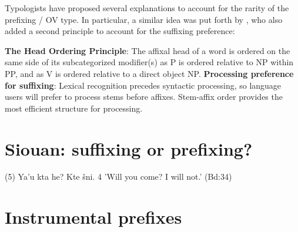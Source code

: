 \documentclass[oldfontcommands,twoside,a4paper,12pt]{article}
\begin{document}
Typologists have proposed several explanations to account for the rarity of the prefixing / OV type. In particular, a similar idea was put forth by \citet[227]{hawkins88prefixing}, who also added a second principle to account for the suffixing preference:
\begin{exe}
\ex \label{ex:hawkins}
\begin{xlist}[(ii)]
\glt \textbf{The Head Ordering Principle}: The affixal head of a word is ordered on the same side of its
subcategorized modifier(s) as P is ordered relative to NP within PP, and as V is ordered relative to a direct object NP.
\glt \textbf{Processing preference for suffixing}:
Lexical recognition precedes syntactic processing, so language users will prefer to process stems before affixes. Stem-affix order provides the most efficient structure for processing.
   \end{xlist}
\end{exe}

\citet{mithun03prefixes}

\citet{rice2000scope}

\citet{jacques13harmonization}

\section{Siouan: suffixing or prefixing?}
\citet{taylor96lakhota}

\citet[155]{reuse82enclitics}

(5) Ya'u kta he? Kte šni. 4
'Will you come? I will not.' (Bd:34)

\section{Instrumental prefixes}



\end{document}
